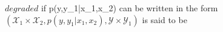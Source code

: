 \documentclass[preview]{standalone}
\begin{document}
\begin{center}
$\textit{degraded}$ if p(y,y_1|x_1,x_2) can be written in the form $(\mathscr{X}_1 \times \mathscr{X}_2 ,p(y,y_1|x_1,x_2),\mathscr{Y} \times \mathscr{Y}_1)$ is said to be
\end{center}
\end{document}
